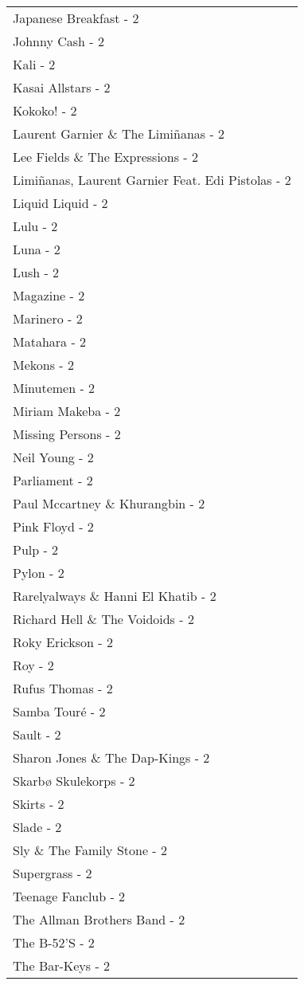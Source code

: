 \documentclass[
]{article}
\begin{document}
\begin{longtable}{l}
Japanese Breakfast - 2 \\ 
Johnny Cash - 2 \\ 
Kali - 2 \\ 
Kasai Allstars - 2 \\ 
Kokoko! - 2 \\ 
Laurent Garnier \& The Limiñanas - 2 \\ 
Lee Fields \& The Expressions - 2 \\ 
Limiñanas, Laurent Garnier Feat. Edi Pistolas - 2 \\ 
Liquid Liquid - 2 \\ 
Lulu - 2 \\ 
Luna - 2 \\ 
Lush - 2 \\ 
Magazine - 2 \\ 
Marinero - 2 \\ 
Matahara - 2 \\ 
Mekons - 2 \\ 
Minutemen - 2 \\ 
Miriam Makeba - 2 \\ 
Missing Persons - 2 \\ 
Neil Young - 2 \\ 
Parliament - 2 \\ 
Paul Mccartney \& Khurangbin - 2 \\ 
Pink Floyd - 2 \\ 
Pulp - 2 \\ 
Pylon - 2 \\ 
Rarelyalways \& Hanni El Khatib - 2 \\ 
Richard Hell \& The Voidoids - 2 \\ 
Roky Erickson - 2 \\ 
Roy - 2 \\ 
Rufus Thomas - 2 \\ 
Samba Touré - 2 \\ 
Sault - 2 \\ 
Sharon Jones \& The Dap-Kings - 2 \\ 
Skarbø Skulekorps - 2 \\ 
Skirts - 2 \\ 
Slade - 2 \\ 
Sly \& The Family Stone - 2 \\ 
Supergrass - 2 \\ 
Teenage Fanclub - 2 \\ 
The Allman Brothers Band - 2 \\ 
The B-52'S - 2 \\ 
The Bar-Keys - 2 \\ 

\end{longtable}
\end{document}
